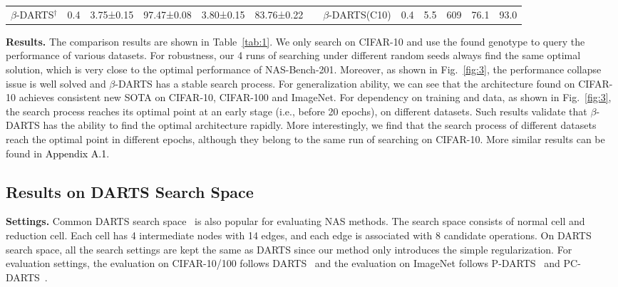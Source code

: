 \documentclass[10pt,twocolumn,letterpaper]{article}
\newcommand{\bp}[1]{\textcolor{black}{#1}}
\begin{document}
\begin{table*}[t]
\begin{center}
{\begin{tabular}{lcccccllccccc}
$\beta$-DARTS$^\dagger$        & 0.4                                                                    & 3.75±0.15    & 97.47±0.08    & 3.80±0.15     & 83.76±0.22    &  & $\beta$-DARTS(C10)                    & 0.4                                                   & 5.5                                                   & 609                                                   & 76.1                                                                     & 93.0                                                                     \\ \cline{1-6} \cline{8-13} 
\end{tabular}
}
\end{center}
\vspace{-12pt}
\end{table*}


\noindent\textbf{Results.} The comparison results are shown in Table~\ref{tab:1}. We only search on CIFAR-10 and use the found genotype to query the performance of various datasets. For robustness, our 4 runs of searching under different random seeds always find the same optimal solution, which is very close to the optimal performance of NAS-Bench-201. Moreover, as shown in Fig.~\ref{fig:3}, the performance collapse issue is well solved and $\beta$-DARTS has a stable search process. For generalization ability, we can see that the architecture found on CIFAR-10 achieves consistent new SOTA on CIFAR-10, CIFAR-100 and ImageNet. For dependency on training and data, as shown in Fig.~\ref{fig:3}, the search process reaches its optimal point at an early stage (i.e., before 20 epochs), on different datasets. Such results validate that $\beta$-DARTS has the ability to find the optimal architecture rapidly. More interestingly, we find that the search process of different datasets reach the optimal point in different epochs, although they belong to the same run of searching on CIFAR-10. More similar results can be found in \bp{Appendix A.1}.

\subsection{Results on DARTS Search Space} 
\noindent\textbf{Settings.} Common DARTS search space~\cite{darts} is also popular for evaluating NAS methods. The search space consists of normal cell and reduction cell. Each cell has 4 intermediate nodes with 14 edges, and each edge is associated with 8 candidate operations. On DARTS search space, all the search settings are kept the same as DARTS since our method only introduces the simple regularization. For evaluation settings, the evaluation on CIFAR-10/100 follows DARTS~\cite{darts} and the evaluation on ImageNet follows P-DARTS~\cite{pdarts} and PC-DARTS~\cite{pc-darts}. 
\end{document}
